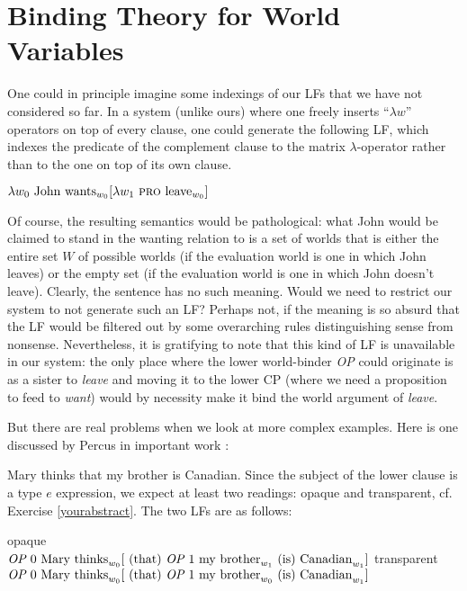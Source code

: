 \section{Binding Theory for World Variables}

One could in principle imagine some indexings of our LFs that we have not
considered so far. In a system (unlike ours) where one freely inserts ``$\lambda
w$'' operators on top of every clause, one could generate the following LF,
which indexes the predicate of the complement clause to the matrix
$\lambda$-operator rather than to the one on top of its own clause.

\ex
$\lambda w_{0} \mbox{ John wants}_{w_{0}} [ \lambda w_{1} \mbox{ \textsc{pro} }
\mbox{leave}_{w_{0}} ]$ \xe

Of course, the resulting semantics would be pathological: what John would be
claimed to stand in the wanting relation to is a set of worlds that is either
the entire set $W$ of possible worlds (if the evaluation world is one in which
John leaves) or the empty set (if the evaluation world is one in which John
doesn't leave). Clearly, the sentence has no such meaning. Would we need to
restrict our system to not generate such an LF? Perhaps not, if the meaning is
so absurd that the LF would be filtered out by some overarching rules
distinguishing sense from nonsense. Nevertheless, it is gratifying to note that
this kind of LF is unavailable in our system: the only place where the lower
world-binder \emph{OP} could originate is as a sister to \emph{leave} and moving
it to the lower CP (where we need a proposition to feed to \emph{want}) would by
necessity make it bind the world argument of \emph{leave}.

But there are real problems when we look at more complex examples. Here is one
discussed by Percus in important work \parencite{percus-2000-constraints}:

\ex Mary thinks that my brother is Canadian. \xe
%
Since the subject of the lower clause is a type $e$ expression, we expect at
least two readings: opaque and transparent, cf. Exercise \ref{yourabstract}. The
two LFs are as follows:

\pex
\a opaque\\
$\emph{OP } 0 \mbox{ Mary thinks}_{w_{0}} [ \mbox{ (that) } \emph{OP } 1 \mbox{
  my brother}_{w_{1}} \mbox{ (is) Canadian}_{w_{1}} ]$
\a transparent\\
$\emph{OP } 0 \mbox{ Mary thinks}_{w_{0}} [ \mbox{ (that) } \emph{OP } 1 \mbox{
  my brother}_{w_{0}} \mbox{ (is) Canadian}_{w_{1}} ]$ \xe

